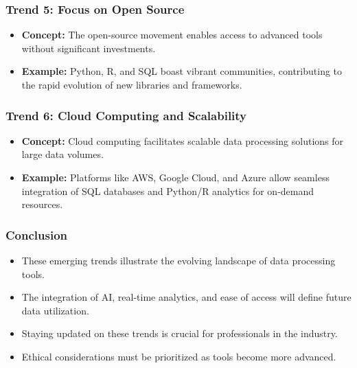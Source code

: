 \documentclass[aspectratio=169]{beamer}
\begin{document}
\begin{frame}[fragile]
    \frametitle{Trend 5: Focus on Open Source}
    \begin{itemize}
        \item \textbf{Concept:} The open-source movement enables access to advanced tools without significant investments.
        \item \textbf{Example:} Python, R, and SQL boast vibrant communities, contributing to the rapid evolution of new libraries and frameworks.
    \end{itemize}
\end{frame}

\begin{frame}[fragile]
    \frametitle{Trend 6: Cloud Computing and Scalability}
    \begin{itemize}
        \item \textbf{Concept:} Cloud computing facilitates scalable data processing solutions for large data volumes.
        \item \textbf{Example:} Platforms like AWS, Google Cloud, and Azure allow seamless integration of SQL databases and Python/R analytics for on-demand resources.
    \end{itemize}
\end{frame}

\begin{frame}[fragile]
    \frametitle{Conclusion}
    \begin{itemize}
        \item These emerging trends illustrate the evolving landscape of data processing tools.
        \item The integration of AI, real-time analytics, and ease of access will define future data utilization.
        \item Staying updated on these trends is crucial for professionals in the industry.
        \item Ethical considerations must be prioritized as tools become more advanced.
    \end{itemize}
\end{frame}
\end{document}
